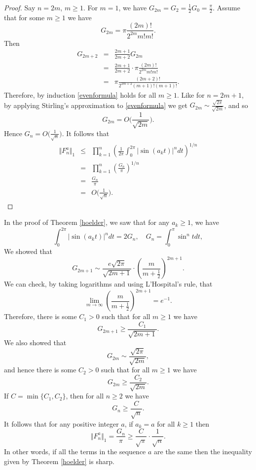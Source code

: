 \documentclass{amsart}
\newcommand{\norm}[1]{\Vert #1 \Vert}
\begin{document}
\begin{proof}
Say $n=2m$, $m \geq 1$. For $m=1$, we have $G_{2m}=G_2=\frac{1}{2}G_0=\frac{\pi}{2}$. 
Assume that for some $m \geq 1$ we have
\begin{equation}
G_{2m}=\pi \frac{(2m)!}{2^{2m}m!m!}.
\label{evenformula}
\end{equation}
Then
\begin{eqnarray*}
G_{2m+2}&=&\frac{2m+1}{2m+2}G_{2m}\\
&=&\frac{2m+1}{2m+2}\cdot \pi \frac{(2m)!}{2^{2m}m!m!}\\
&=&\pi \frac{(2m+2)!}{2^{2m+2}(m+1)!(m+1)!}.
\end{eqnarray*}
Therefore, by induction \eqref{evenformula} holds for all $m \geq 1$.
Like for $n=2m+1$, by applying Stirling's approximation to \eqref{evenformula} we get
$G_{2m} \sim \frac{\sqrt{2\pi}}{\sqrt{2m}}$, and so
\[
G_{2m}=O\Big(\frac{1}{\sqrt{2m}}\Big).
\]
Hence $G_n = O\Big(\frac{1}{\sqrt{n}}\Big)$.
It follows that
\begin{eqnarray*}
\norm{F_n^a}_1 &\leq& \prod_{k=1}^n \left(\frac{1}{2\pi}\int_0^{2\pi} |\sin (a_kt)|^n dt \right)^{1/n}\\
&=&\prod_{k=1}^n \left( \frac{G_n}{\pi} \right)^{1/n}\\
&=&\frac{G_n}{\pi}\\
&=&O\Big(\frac{1}{\sqrt{n}}\Big).
\end{eqnarray*}
\end{proof}

In the proof of Theorem \ref{hoelder}, we saw that for any $a_k \geq 1$, we have
\[
\int_0^{2\pi} |\sin(a_k t)|^n dt=2G_n, \quad G_n=\int_0^\pi \sin^n t dt,
\]
We showed that 
\[
G_{2m+1} \sim \frac{e\sqrt{2\pi}}{\sqrt{2m+1}} \cdot \left(\frac{m}{m+\frac{1}{2}} \right)^{2m+1}.
\]
We can check, by taking logarithms and using L'Hospital's rule, that
\[
\lim_{m \to \infty} \left(\frac{m}{m+\frac{1}{2}} \right)^{2m+1} = e^{-1}.
\]
Therefore, there is some $C_1>0$ such that for all $m \geq 1$ we have
\[
G_{2m+1} \geq \frac{C_1}{\sqrt{2m+1}}.
\]
We also showed that
\[
G_{2m} \sim \frac{\sqrt{2\pi}}{\sqrt{2m}},
\]
and hence there is some $C_2 >0$ such that for all $m \geq 1$ we have
\[
G_{2m} \geq \frac{C_2}{\sqrt{2m}}.
\]
If $C=\min\{C_1,C_2\}$, then for all $n \geq 2$ we have
\[
G_n \geq \frac{C}{\sqrt{n}}.
\]
It follows that for any positive integer $a$, if $a_k = a$ for all $k \geq 1$ then
\[
\norm{F_n^a}_1 = \frac{G_n}{\pi} \geq \frac{C}{\sqrt{\pi}}\cdot \frac{1}{\sqrt{n}}.
\]
In other words, if all the terms in the sequence $a$ are the same then the inequality given by Theorem \ref{hoelder} is sharp.
\end{document}
